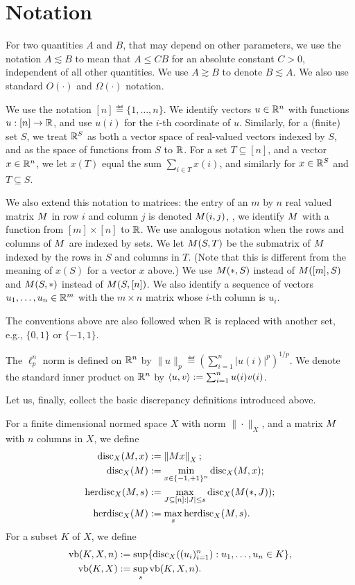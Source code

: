 \section{Notation}

For two quantities $A$ and $B$, that may depend on other parameters,
we use the notation $A\lesssim B$ to mean that $A \le CB$ for an
absolute constant $C > 0$, independent of all other quantities. We use
$A \gtrsim B$ to denote $B \lesssim A$. We also use standard $O(\cdot)$ and $\Omega(\cdot)$ notation.

We use the notation $[n] \eqdef \{1, \ldots, n\}$. We identify vectors
$u \in \mathbb{R}^n$ with functions $u:[n] \to \mathbb{R}$, and use $u(i)$ for the
$i$-th coordinate of $u$. Similarly, for a (finite) set $S$, we treat
$\mathbb{R}^S$ as both a vector space of real-valued vectors indexed by $S$,
and as the space of functions from $S$ to $\mathbb{R}$. For a set $T\subseteq
[n]$, and a vector $x \in \mathbb{R}^n$, we let $x(T)$ equal the sum $\sum_{i
  \in T}{x(i)}$, and similarly for $x \in \mathbb{R}^S$ and $T \subseteq S$.

We also extend this notation to matrices: the entry of an $m$ by $n$
real valued matrix $M$ in row $i$ and column $j$ is denoted
$M(i,j)$, \ie, we identify $M$ with a function from
$[m]\times [n]$ to $\mathbb{R}$. We use analogous notation when the rows and
columns of $M$ are indexed by sets. We let $M(S,T)$ be the
submatrix of $M$ indexed by the rows in $S$ and columns in
$T$. (Note that this is different from the meaning of $x(S)$ for a
vector $x$ above.) We use $M(*,S)$ instead of $M([m], S)$ and $M(S,*)$ instead of $M(S,[n])$. We also identify a sequence of vectors
$u_1, \ldots, u_n \in \mathbb{R}^m$ with the $m\times n$ matrix whose $i$-th
column is $u_i$.

The conventions above are also followed when $\mathbb{R}$ is replaced with
another set, e.g., $\{0,1\}$ or $\{-1,1\}$.

The $\ell_p^n$ norm is defined on $\mathbb{R}^n$ by $\|u\|_p \eqdef \left(\sum_{i
  =1}^n |u(i)|^p\right)^{1/p}$. We denote the standard inner product
on $\mathbb{R}^n$ by $\langle u,v\rangle := \sum_{i=1}^n u(i)v(i)$.

Let us, finally, collect the basic discrepancy definitions introduced
above.

For a finite dimensional normed space $X$ with norm $\|\cdot \|_X$, and a matrix $M$ with $n$ columns in $X$, we define
\begin{align*}
  \operatorname{disc}_X(M,x)&:= \left\|Mx\right\|_X;\\
  \operatorname{disc}_X(M) &:= \min_{x \in \{-1,+1\}^n}\operatorname{disc}_X(M,x);\\
  \operatorname{herdisc}_X(M, s) &:=
                                 \max_{J \subseteq [n]: |J| \le s}
                                 \operatorname{disc}_X(M(*,J));\\
  \operatorname{herdisc}_X(M) &:= \max_{s} \operatorname{herdisc}_X(M, s).
\end{align*}
For a subset $K$ of $X$, we define
\begin{align*}
  \operatorname{vb}(K,X,n) &:= \sup\{\operatorname{disc}_X((u_i)_{i=1}^n): u_1, \ldots, u_n  \in K\},\\
  \operatorname{vb}(K,X) &:= \sup_s \operatorname{vb}(K,X,n). 
\end{align*}

